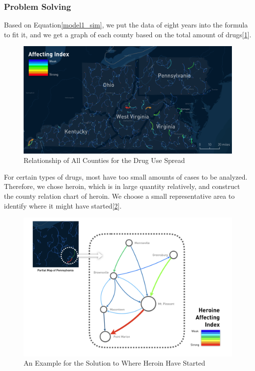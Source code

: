 \documentclass{mcmthesis}
\begin{document}
\subsubsection{Problem Solving}
Based on Equation\eqref{model1_sim}, we put the data of eight years into the formula to fit it, and we get a graph of each county based on the total amount of drugs[\ref{all_relation}].
\begin{figure}[ht]
	\centering
	\includegraphics[width=15cm]{figure-release/Model1.FlowMap.png}
	\caption{Relationship of All Counties for the Drug Use Spread}\label{all_relation}
\end{figure}

For certain types of drugs, most have too small amounts of cases to be analyzed. Therefore, we chose heroin, which is in large quantity relatively, and construct the county relation chart of heroin. We choose a small representative area to identify where it might have started[\ref{model1_heroin}].
\begin{figure}[ht]
	\centering
	\includegraphics[width=15cm]{figure-release/Model1.Abstract.png}
	\caption{An Example for the Solution to Where Heroin Have Started}\label{model1_heroin}
\end{figure}
\end{document}
